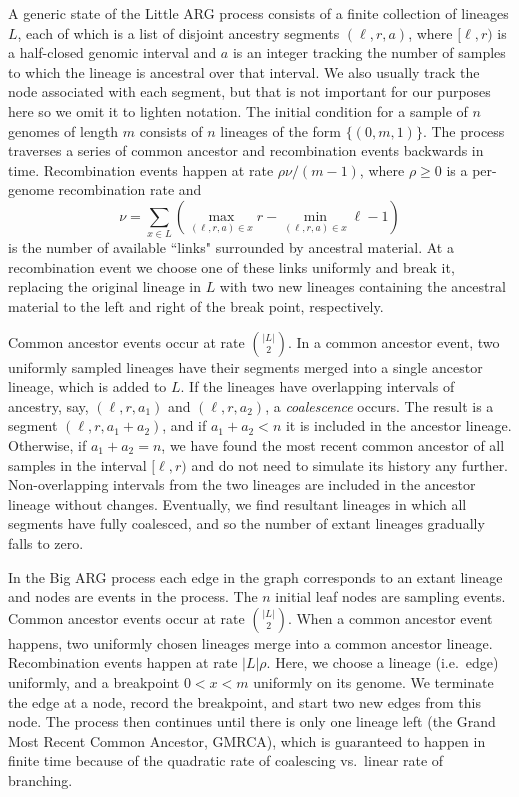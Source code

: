 \documentclass{article}
\begin{document}
A generic state of the Little ARG process consists of a finite collection of lineages $L$,
each of which is a list of disjoint ancestry segments $(\ell, r, a)$, where
$[\ell, r)$ is a half-closed genomic interval and $a$ is an integer
tracking the number of samples to which the lineage is ancestral over that interval.
We also usually track the node associated with each segment, but
that is not important for our purposes here so we omit it to lighten notation.
The initial condition for a sample of $n$ genomes of length $m$ consists of $n$ lineages
of the form $\{(0, m, 1)\}$. The process traverses a series of common ancestor and
recombination events backwards in time.
Recombination events happen at rate $\rho \nu / (m - 1)$,
where $\rho \geq 0$ is a per-genome recombination rate and
 \[
 \nu = \sum_{x \in L}\left( \max_{(\ell, r, a) \in x}r
     - \min_{(\ell, r, a) \in x}\ell - 1 \right)
 \]
 is the number of available ``links" surrounded by ancestral material.
 At a recombination event we choose one of these links uniformly and break it,
 replacing the original lineage in $L$ with two new lineages containing the ancestral material
 to the left and right of the break point, respectively.

Common ancestor events occur at rate $\binom{|L|}{2}$.
In a common ancestor event, two uniformly sampled lineages have their segments
merged into a single ancestor lineage, which is added to $L$.
If the lineages have overlapping intervals of ancestry,
say, $(\ell, r, a_1)$ and $(\ell, r, a_2)$, a
\emph{coalescence} occurs. The result is a segment
$(\ell, r, a_1 + a_2)$, and if $a_1 + a_2 < n$ it is included in the
ancestor lineage. Otherwise, if $a_1 + a_2 = n$, we have found
the most recent common ancestor of all samples in the interval $[\ell, r)$
and do not need to simulate its history any further.
Non-overlapping intervals from the two lineages are included
 in the ancestor lineage without changes. Eventually,
we find resultant lineages in which all segments have fully coalesced,
and so the number of extant lineages gradually falls to zero.

In the Big ARG process each edge in the graph corresponds to an extant
lineage and nodes are events in the process. The $n$ initial leaf nodes are
sampling events. Common ancestor events occur at rate $\binom{|L|}{2}$.
When a common ancestor event happens, two uniformly chosen lineages
merge into a common ancestor lineage.
Recombination events happen at rate $|L| \rho$. Here, we choose a lineage (i.e.\ edge) uniformly,
and a breakpoint $0 < x < m$ uniformly on its genome. We terminate the edge at a
node, record the breakpoint, and start two new edges from this node. The process
then continues until there is only one lineage left (the Grand Most Recent
Common Ancestor, GMRCA), which is guaranteed to
happen in finite time because of the quadratic rate of coalescing vs.\ linear rate of branching.
\end{document}
